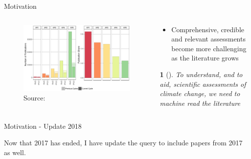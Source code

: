 \documentclass[9pt]{beamer}
\newtheorem*{remark}{}
\begin{document}
\begin{frame}{Motivation}

\begin{columns}
	\begin{column}{0.5\linewidth}
		\begin{center}
\begin{figure}
	\includegraphics[width=0.85\linewidth]{merged_IPCC_spectral.png}
	\caption{Source: \citet{Minx2017l} }
\end{figure}
		\end{center}
	\end{column}
	\begin{column}{0.5\linewidth}
		\begin{center}
			\begin{itemize}
				\item Comprehensive, credible and relevant assessments become
				more challenging as the literature grows
			\end{itemize}
		\begin{remark}[]
			To understand, and to aid, scientific assessments of climate change, we need to machine read the literature
		\end{remark}
		\end{center}
	\end{column}
\end{columns}

\end{frame}

\begin{frame}{Motivation - Update 2018}

Now that 2017 has ended, I have update the query to include papers from 2017 as well.


\end{frame}
\end{document}
